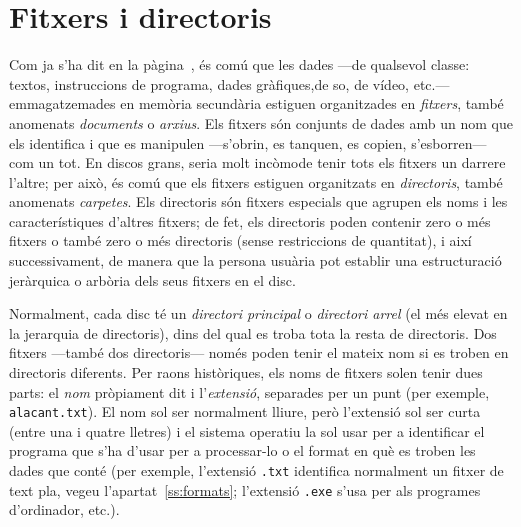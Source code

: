 \section{Fitxers i directoris}
\label{se:fitxers}
\label{pg:fitxer}

Com ja s'ha dit en la pàgina~\pageref{pg:menciofitxer}, és comú que
les dades ---de qualsevol classe: textos, instruccions de programa,
dades gràfiques,de so, de vídeo, etc.--- emmagatzemades en memòria
secundària estiguen organitzades en {\em fitxers}, també
  anomenats \emph{documents} o \emph{arxius}. Els fitxers són
conjunts de dades amb un nom que els identifica i que es manipulen
---s'obrin, es tanquen, es copien, s'esborren--- com un tot. En discos
grans, seria molt incòmode tenir tots els fitxers un darrere l'altre;
per això, és comú que els fitxers estiguen organitzats en {\em
  directoris}, també anomenats \emph{carpetes}. Els
directoris són fitxers especials que agrupen els noms i les
característiques d'altres fitxers; de fet, els directoris poden
contenir zero o més fitxers o també zero o més directoris (sense
restriccions de quantitat), i així successivament, de manera que la
persona usuària pot establir una estructuració jeràrquica o arbòria
dels seus fitxers en el disc.

Normalment, cada disc té un {\em directori principal} o
\emph{directori arrel} (el més elevat en la jerarquia de
directoris), dins del qual es troba tota la resta de directoris. Dos
fitxers ---també dos directoris--- només poden tenir el mateix nom si
es troben en directoris diferents. Per raons històriques, els noms de
fitxers solen tenir dues parts: el \emph{nom} pròpiament dit i
l'\emph{extensió}, separades per un punt (per exemple,
\texttt{alacant.txt}). El nom sol ser normalment lliure, però
l'extensió sol ser curta (entre una i quatre lletres) i el sistema
operatiu la sol usar per a identificar el programa que s'ha d'usar per
a processar-lo o el format en què es troben les dades que conté (per
exemple, l'extensió \texttt{.txt} identifica normalment un fitxer de text
pla, vegeu l'apartat~\ref{ss:formats};
l'extensió \texttt{.exe} s'usa per als programes d'ordinador, etc.).

